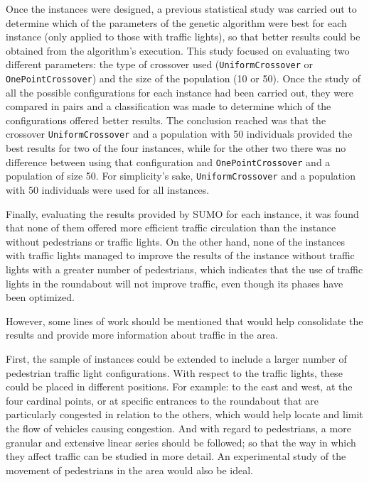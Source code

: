 Once the instances were designed, a previous statistical study was carried out to determine which of the parameters of the genetic algorithm were best for each instance (only applied to those with traffic lights), so that better results could be obtained from the algorithm's execution. This study focused on evaluating two different parameters: the type of crossover used (\texttt{UniformCrossover} or \texttt{OnePointCrossover}) and the size of the population (10 or 50). Once the study of all the possible configurations for each instance had been carried out, they were compared in pairs and a classification was made to determine which of the configurations offered better results. The conclusion reached was that the crossover \texttt{UniformCrossover} and a population with 50 individuals provided the best results for two of the four instances, while for the other two there was no difference between using that configuration and \texttt{OnePointCrossover} and a population of size 50. For simplicity's sake, \texttt{UniformCrossover} and a population with 50 individuals were used for all instances.

Finally, evaluating the results provided by SUMO for each instance, it was found that none of them offered more efficient traffic circulation than the instance without pedestrians or traffic lights. On the other hand, none of the instances with traffic lights managed to improve the results of the instance without traffic lights with a greater number of pedestrians, which indicates that the use of traffic lights in the roundabout will not improve traffic, even though its phases have been optimized.

However, some lines of work should be mentioned that would help consolidate the results and provide more information about traffic in the area.

First, the sample of instances could be extended to include a larger number of pedestrian traffic light configurations. With respect to the traffic lights, these could be placed in different positions. For example: to the east and west, at the four cardinal points, or at specific entrances to the roundabout that are particularly congested in relation to the others, which would help locate and limit the flow of vehicles causing congestion. And with regard to pedestrians, a more granular and extensive linear series should be followed; so that the way in which they affect traffic can be studied in more detail. An experimental study of the movement of pedestrians in the area would also be ideal.

